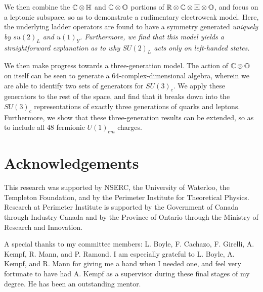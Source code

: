 We then combine the $\mathbb{C}\otimes\mathbb{H}$ and $\mathbb{C}\otimes\mathbb{O}$ portions of $\mathbb{R}\otimes\mathbb{C}\otimes\mathbb{H}\otimes\mathbb{O}$, and focus on a leptonic subspace, so as to demonstrate a rudimentary electroweak model.  Here, the underlying ladder operators are found to have a symmetry generated \it uniquely \rm by $su(2)_L$ and $u(1)_Y$.  Furthermore, we find that this model yields a straightforward explanation as to why $SU(2)_L$ acts only on left-handed states.

We then make progress towards a three-generation model.  The action of $\mathbb{C}\otimes\mathbb{O}$ on itself can be seen to generate a 64-complex-dimensional algebra, wherein we are able to identify two sets of generators for $SU(3)_c$.  We  apply these generators to the rest of the space, and find that it breaks down into the $SU(3)_c$ representations of exactly three generations of quarks and leptons.  Furthermore, we show that these three-generation results can be extended, so as to include all 48 fermionic $U(1)_{em}$ charges.






















 \cleardoublepage



\section{Acknowledgements}

This research was supported by NSERC, the University of Waterloo, the Templeton Foundation, and by the Perimeter Institute for Theoretical Physics.  Research at Perimeter Institute is supported by the Government of Canada through Industry Canada and by the Province of Ontario through the Ministry of Research and Innovation.

A special thanks to my committee members:  L. Boyle, F. Cachazo, F. Girelli, A. Kempf, R. Mann, and P. Ramond.   I am especially grateful to L. Boyle,   A. Kempf, and R. Mann for giving me a hand when I needed one, and feel very fortunate to have had A. Kempf as a supervisor during these final stages of my degree.  He has been an outstanding mentor.

